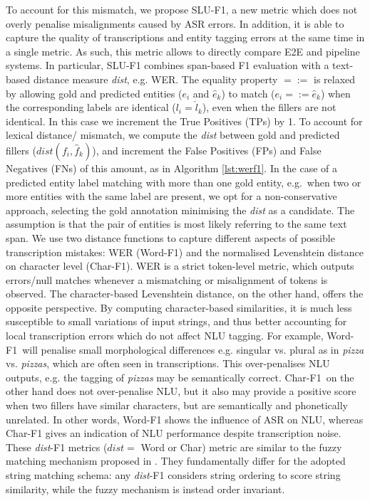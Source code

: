 \documentclass[11pt,a4paper]{article}
\newcommand{\metricname}{SLU-F1}
\newcommand{\werm}{Word-F1}
\newcommand{\levm}{Char-F1}
\newcommand{\etoe}{E2E}
\newcommand{\asr}{ASR}
\newcommand{\nlu}{NLU}
\newcommand{\wer}{WER}
\newcommand{\tp}{TPs}
\newcommand{\fp}{FPs}
\newcommand{\fn}{FNs}
\begin{document}
To account for this mismatch, we propose \metricname, a new metric which does not  overly penalise misalignments caused by \asr{} errors. In addition, it is able to capture the quality of transcriptions and entity tagging errors at the same time in a single metric. As such, this  metric allows to directly compare \etoe{}  and pipeline systems. In particular, \metricname{} combines span-based F1 evaluation with a text-based distance measure \textit{dist}, e.g. \wer. The equality property $=:=$ is  relaxed by allowing gold and predicted entities ($e_i$ and $\hat{e}_k$) to match ($e_i =:= \hat{e}_k$) when the corresponding labels are identical ($l_i = \hat{l}_k$), even when the fillers are not identical. In this case we increment the True Positives (\tp) by 1. To account for lexical distance/ mismatch, we compute the \textit{dist} between gold and predicted fillers ($dist(f_i, \hat{f}_k)$), and increment the False Positives (\fp) and False Negatives (\fn) of this amount, as in Algorithm \ref{lst:werf1}. In the case of a predicted entity label  matching with more than one gold entity, e.g.\ when two or more entities with the same label are present, we opt for a non-conservative approach, selecting the gold annotation minimising the \textit{dist} as a candidate. The assumption is that the pair of entities is most likely referring to the same text span. We use two distance functions to capture different aspects of possible transcription mistakes:  \wer{} (\werm) and the normalised Levenshtein distance on character level (\levm). \wer{} is a strict token-level metric, which outputs errors/null matches whenever a mismatching or misalignment of tokens is observed. 
The character-based Levenshtein distance, on the other hand, offers the opposite perspective. By computing character-based similarities, it is much less susceptible to small variations of input strings, and thus better accounting for local transcription errors which do not affect \nlu{} tagging.
For example, \werm ~will penalise small morphological differences e.g. singular vs. plural as in \textit{pizza} vs. \textit{pizzas}, which are often seen in transcriptions. This  over-penalises \nlu{} outputs, e.g. the tagging of \textit{pizzas} may be semantically correct. \levm ~on the other hand does not over-penalise \nlu, but it also may provide a positive score when two fillers have similar characters, but are semantically and phonetically unrelated.
In other words, \werm{} shows the influence of \asr{} on \nlu, whereas \levm{} gives an indication of \nlu{} performance despite transcription noise.
These \textit{dist}-F1 metrics ($dist=$ Word or Char) metric are similar to the fuzzy matching mechanism proposed in \cite{48919}. They fundamentally differ for the adopted string matching schema: any \textit{dist}-F1 considers string ordering to score string similarity, while the fuzzy mechanism is instead order invariant.
\end{document}
